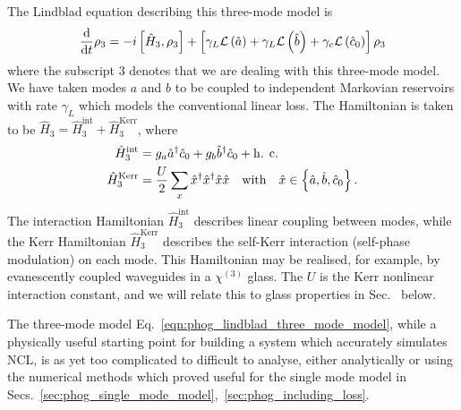 The Lindblad equation describing this three-mode model is
\begin{equation}\label{eqn:phog_lindblad_three_mode_model}
\frac{\mathrm{d}}{\mathrm{d}t} \rho_3 = - i \left[ \hat{H}_3, \rho_3\right] + \left[ \gamma_L \mathcal{L}\left(\hat{a}\right) + \gamma_L \mathcal{L}\left(\hat{b}\right) + \gamma_c \mathcal{L}\left(\hat{c}_0\right)\right] \rho_3
\end{equation}
where the subscript $3$ denotes that we are dealing with this three-mode model. We have taken modes $a$ and $b$ to be coupled to independent Markovian reservoirs with rate $\gamma_L$ which models the conventional linear loss. The Hamiltonian is taken to be $\hat{H}_3 = \hat{H}_3^{\text{int}} + \hat{H}_3^{\text{Kerr}}$, where
\begin{align}\label{eqn:phog_three_mode_hamiltonian}
\hat{H}_3^{\text{int}} &= g_a \hat{a}^\dagger \hat{c}_0 + g_b \hat{b}^\dagger \hat{c}_0 + \hc \notag \\
%
\hat{H}_3^{\text{Kerr}} &= \frac{U}{2} \sum_{x} \hat{x}^\dagger \hat{x}^\dagger \hat{x} \hat{x} \qq{with} \hat{x} \in \left\{\hat{a}, \hat{b}, \hat{c}_0\right\}.
\end{align}
The interaction Hamiltonian $\hat{H}_3^{\text{int}}$ describes linear coupling between modes, while the Kerr Hamiltonian $\hat{H}_3^{\text{Kerr}}$ describes the self-Kerr interaction (self-phase modulation)%
on each mode. This Hamiltonian may be realised, for example, by evanescently coupled waveguides in a $\chi^{\left(3\right)}$ glass. The $U$ is the Kerr nonlinear interaction constant, and we will relate this to glass properties in Sec.~ below.

The three-mode model Eq.~\ref{eqn:phog_lindblad_three_mode_model}, while a physically useful starting point for building a system which accurately simulates NCL, is as yet too complicated to difficult to analyse, either analytically or using the numerical methods which proved useful for the single mode model in Secs.~\ref{sec:phog_single_mode_model},~\ref{sec:phog_including_loss}. 

